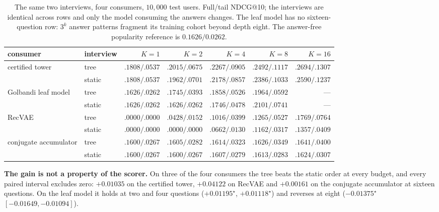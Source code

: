 \documentclass[11pt]{article}
\begin{document}
\begin{table}[t]
\centering
\caption{The same two interviews, four consumers, $10{,}000$ test users. Full/tail NDCG@10; the
interviews are identical across rows and only the model consuming the answers changes. The leaf model
has no sixteen-question row: $3^k$ answer patterns fragment its training cohort beyond depth eight.
The answer-free popularity reference is $0.1626/0.0262$.}
\label{tab:consumers}
\footnotesize
\setlength{\tabcolsep}{4pt}
\begin{tabular}{ll rrrrr}
\toprule
consumer & interview & $K{=}1$ & $K{=}2$ & $K{=}4$ & $K{=}8$ & $K{=}16$ \\
\midrule
\multirow{2}{*}{certified tower} & tree & $.1808/.0537$ & $\mathbf{.2015}/.0675$ & $\mathbf{.2267/.0905}$ & $\mathbf{.2492/.1117}$ & $\mathbf{.2694/.1307}$ \\
 & static & $.1808/.0537$ & $.1962/\mathbf{.0701}$ & $.2178/.0857$ & $.2386/.1033$ & $.2590/.1237$ \\
\midrule
\multirow{2}{*}{Golbandi leaf model} & tree & $.1626/.0262$ & $.1745/.0393$ & $.1858/.0526$ & $.1964/.0592$ & --- \\
 & static & $.1626/.0262$ & $.1626/.0262$ & $.1746/.0478$ & $.2101/.0741$ & --- \\
\midrule
\multirow{2}{*}{RecVAE} & tree & $.0000/.0000$ & $.0428/.0152$ & $.1016/.0399$ & $.1265/.0527$ & $.1769/.0764$ \\
 & static & $.0000/.0000$ & $.0000/.0000$ & $.0662/.0130$ & $.1162/.0317$ & $.1357/.0409$ \\
\midrule
\multirow{2}{*}{conjugate accumulator} & tree & $.1600/.0267$ & $.1605/.0282$ & $.1614/.0323$ & $.1626/.0349$ & $.1641/.0400$ \\
 & static & $.1600/.0267$ & $.1600/.0267$ & $.1607/.0279$ & $.1613/.0283$ & $.1624/.0307$ \\
\bottomrule
\end{tabular}
\end{table}

\textbf{The gain is not a property of the scorer.} On three of the four consumers the tree beats the
static order at every budget, and every paired interval excludes zero: $+0.01035$ on the certified
tower, $+0.04122$ on RecVAE and $+0.00161$ on the conjugate accumulator at sixteen questions. On the
leaf model it holds at two and four questions ($+0.01195^\star$, $+0.01118^\star$) and reverses at
eight ($-0.01375^\star$ $[-0.01649,-0.01094]$).
\end{document}
